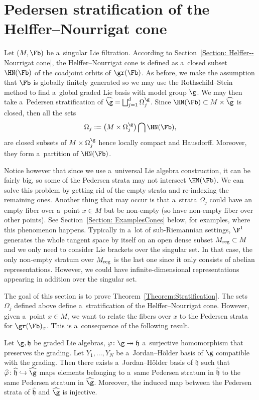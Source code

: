 \section{Pedersen stratification of the Helffer--Nourrigat cone}\label{Section : Stratification HN Cone}

Let $(M,\Fb)$ be a~singular Lie filtration. According to Section~\ref{Section: Helffer--Nourrigat cone}, the Helffer--Nourrigat cone is defined as a~closed subset $\HN(\Fb)$ of the coadjoint orbits of $\gr(\Fb)$. As before, we make the assumption that $\Fb$ is globally finitely generated so we may use the Rothschild--Stein method to find a~global graded Lie basis with model group $\g$. We may then take a~Pedersen stratification of $\widehat{\g} = \bigsqcup_{j=1}^d\Omega_j^{\g}$. Since $\HN(\Fb) \subset M\times \widehat{\g}$ is closed, then all the sets
\[
\Omega_j := \bigl(M\times\Omega_j^{\g}\bigr)\bigcap \HN(\Fb),
\]
are closed subsets of $M \times \Omega_j^{\g}$ hence locally compact and Hausdorff. Moreover, they form a~partition of $\HN(\Fb)$.

Notice however that since we use a~universal Lie algebra construction, it can be fairly big, so some of the Pedersen strata may not intersect $\HN(\Fb)$. We can solve this problem by getting rid of the empty strata and re-indexing the remaining ones. Another thing that may occur is that a~strata $\Omega_j$ could have an empty fiber over a~point $x \in M$ but be non-empty (so have non-empty fiber over other points). See Section~\ref{Section: ExamplesCones} below, for examples, where this phenomenon happens. Typically in a~lot of sub-Riemannian settings, $\F^1$ generates the whole tangent space by itself on an open dense subset $M_{\rm reg}\subset M$ and we only need to consider Lie brackets over the singular set. In that case, the only non-empty stratum over $M_{\rm reg}$ is the last one since it only consists of abelian representations. However, we could have infinite-dimensional representations appearing in addition over the singular set.

The goal of this section is to prove Theorem~\ref{Theorem:Stratification}. The sets $\Omega_j$ defined above define a~stratification of the Helffer--Nourrigat cone. However, given a~point $x \in M$, we want to relate the fibers over $x$ to the Pedersen strata for $\gr(\Fb)_x$. This is a~consequence of the following result.

\begin{lem}
 Let $\g,\mathfrak{h}$ be graded Lie algebras, $\varphi\colon \g\twoheadrightarrow\mathfrak{h}$ a~surjective homomorphism that preserves the grading. Let $Y_1, \dots, Y_N$ be a~Jordan--H\"older basis of $\g$ compatible with the grading. Then there exists a~Jordan--H\"older basis of $\mathfrak{h}$ such that $\widehat{\varphi} \colon \widehat{\mathfrak{h}} \hookrightarrow \widehat{\g}$ maps elements belonging to a~same Pedersen stratum in $\widehat{\mathfrak{h}}$ to the same Pedersen stratum in $\widehat{\g}$. Moreover, the induced map between the Pedersen strata of $\widehat{\mathfrak{h}}$ and $\widehat{\g}$ is injective.
\end{lem}

